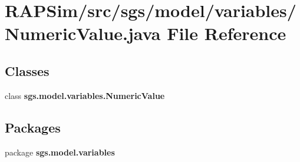 \section{R\-A\-P\-Sim/src/sgs/model/variables/\-Numeric\-Value.java File Reference}
\label{_numeric_value_8java}
\subsection*{Classes}
\begin{DoxyCompactItemize}
\item 
class {\bf sgs.\-model.\-variables.\-Numeric\-Value}
\end{DoxyCompactItemize}
\subsection*{Packages}
\begin{DoxyCompactItemize}
\item 
package {\bf sgs.\-model.\-variables}
\end{DoxyCompactItemize}
